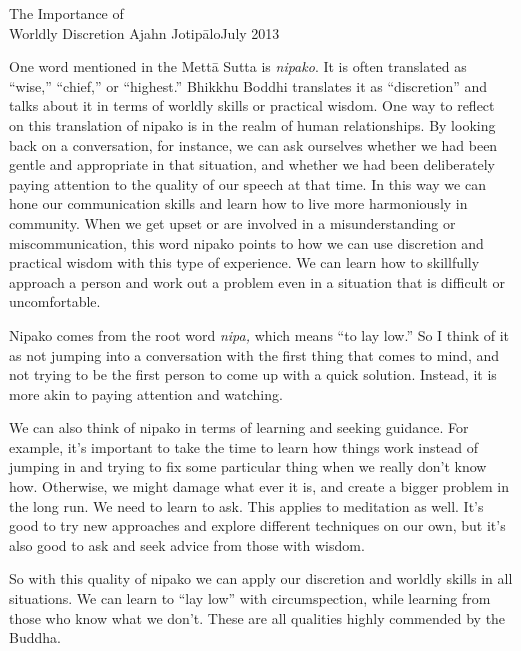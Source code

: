 {The Importance of\\Worldly Discretion}
{Ajahn Jotipālo}{July 2013}

One word mentioned in the Mettā Sutta is \emph{nipako}. It is often 
translated as ``wise,'' ``chief,'' or ``highest.'' Bhikkhu Boddhi 
translates it as ``discretion'' and talks about it in terms of worldly 
skills or practical wisdom. One way to reflect on this translation of 
nipako is in the realm of human relationships. By looking back on a 
conversation, for instance, we can ask ourselves whether we had been 
gentle and appropriate in that situation, and whether we had been 
deliberately paying attention to the quality of our speech at that 
time. In this way we can hone our communication skills and learn how to 
live more harmoniously in community. When we get upset or are involved 
in a misunderstanding or miscommunication, this word nipako points to 
how we can use discretion and practical wisdom with this type of 
experience. We can learn how to skillfully approach a person and work 
out a problem even in a situation that is difficult or uncomfortable.

Nipako comes from the root word \emph{nipa,} which means ``to lay 
low.'' So I think of it as not jumping into a conversation with the 
first thing that comes to mind, and not trying to be the first person 
to come up with a quick solution. Instead, it is more akin to paying 
attention and watching.

We can also think of nipako in terms of learning and seeking guidance. 
For example, it's important to take the time to learn how things work 
instead of jumping in and trying to fix some particular thing when we 
really don't know how. Otherwise, we might damage what ever it is, and 
create a bigger problem in the long run. We need to learn to ask. This 
applies to meditation as well. It's good to try new approaches and 
explore different techniques on our own, but it's also good to ask and 
seek advice from those with wisdom.

So with this quality of nipako we can apply our discretion and worldly 
skills in all situations. We can learn to ``lay low'' with 
circumspection, while learning from those who know what we don't. These 
are all qualities highly commended by the Buddha.

